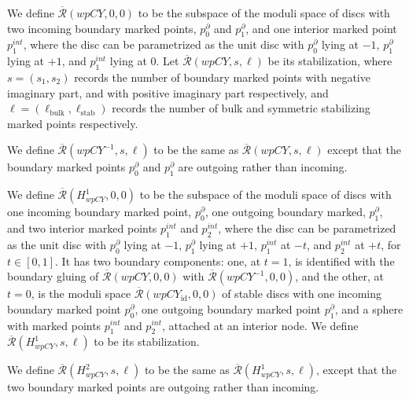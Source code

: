 \documentclass{article}
\def\id{\mathrm{id}}
\def\Rbar{\overline{\mathcal{R}}}
\def\stab{\mathrm{stab}}
\def\bulk{{\operatorname{bulk}}}
\begin{document}
We define $\Rbar(wpCY,0,0)$ to be the subspace of the moduli space of discs with two incoming boundary marked points, $p_0^\partial$ and $p_1^\partial$, and one interior marked point $p_1^{int}$, where the disc can be parametrized as the unit disc with $p_0^\partial$ lying at $-1$, $p_1^\partial$ lying at $+1$, and $p_1^{int}$ lying at $0$. Let $\Rbar(wpCY,s,\ell)$ be its stabilization, where $s=(s_1,s_2)$ records the number of boundary marked points with negative imaginary part, and with positive imaginary part respectively, and $\ell=(\ell_\bulk,\ell_\stab)$ records the number of bulk and symmetric stabilizing marked points respectively. 

We define $\Rbar(wpCY^{-1},s,\ell)$ to be the same as $\Rbar(wpCY,s,\ell)$ except that the boundary marked points $p_0^\partial$ and $p_1^\partial$ are outgoing rather than incoming. 

We define $\Rbar(H^1_{wpCY},0,0)$ to be the subspace of the moduli space of discs with one incoming boundary marked point, $p_0^\partial$, one outgoing boundary marked, $p_1^\partial$, and two interior marked points $p_1^{int}$ and $p_2^{int}$, where the disc can be parametrized as the unit disc with $p_0^\partial$ lying at $-1$, $p_1^\partial$ lying at $+1$, $p_1^{int}$ at $-t$, and $p_2^{int}$ at $+t$, for $t \in [0,1]$. 
It has two boundary components: one, at $t=1$, is identified with the boundary gluing of $\Rbar(wpCY,0,0)$ with $\Rbar(wpCY^{-1},0,0)$, and the other, at $t=0$, is the moduli space $\Rbar(wpCY_{\id},0,0)$ of stable discs with one incoming boundary marked point $p_0^\partial$, one outgoing boundary marked point $p_1^\partial$, and a sphere with marked points $p_1^{int}$ and $p_2^{int}$, attached at an interior node. 
We define $\Rbar(H^1_{wpCY},s,\ell)$ to be its stabilization.

We define $\Rbar(H^2_{wpCY},s,\ell)$ to be the same as $\Rbar(H^1_{wpCY},s,\ell)$, except that the two boundary marked points are outgoing rather than incoming.
\end{document}
